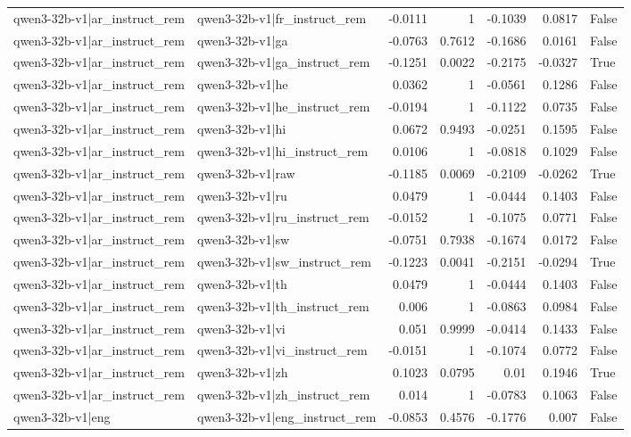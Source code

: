 \begin{table}
\begin{tabular}{l l r r r r l}
qwen3-32b-v1|ar_instruct_rem & qwen3-32b-v1|fr_instruct_rem & -0.0111 & 1 & -0.1039 & 0.0817 & False \\
qwen3-32b-v1|ar_instruct_rem & qwen3-32b-v1|ga & -0.0763 & 0.7612 & -0.1686 & 0.0161 & False \\
qwen3-32b-v1|ar_instruct_rem & qwen3-32b-v1|ga_instruct_rem & -0.1251 & 0.0022 & -0.2175 & -0.0327 & True \\
qwen3-32b-v1|ar_instruct_rem & qwen3-32b-v1|he & 0.0362 & 1 & -0.0561 & 0.1286 & False \\
qwen3-32b-v1|ar_instruct_rem & qwen3-32b-v1|he_instruct_rem & -0.0194 & 1 & -0.1122 & 0.0735 & False \\
qwen3-32b-v1|ar_instruct_rem & qwen3-32b-v1|hi & 0.0672 & 0.9493 & -0.0251 & 0.1595 & False \\
qwen3-32b-v1|ar_instruct_rem & qwen3-32b-v1|hi_instruct_rem & 0.0106 & 1 & -0.0818 & 0.1029 & False \\
qwen3-32b-v1|ar_instruct_rem & qwen3-32b-v1|raw & -0.1185 & 0.0069 & -0.2109 & -0.0262 & True \\
qwen3-32b-v1|ar_instruct_rem & qwen3-32b-v1|ru & 0.0479 & 1 & -0.0444 & 0.1403 & False \\
qwen3-32b-v1|ar_instruct_rem & qwen3-32b-v1|ru_instruct_rem & -0.0152 & 1 & -0.1075 & 0.0771 & False \\
qwen3-32b-v1|ar_instruct_rem & qwen3-32b-v1|sw & -0.0751 & 0.7938 & -0.1674 & 0.0172 & False \\
qwen3-32b-v1|ar_instruct_rem & qwen3-32b-v1|sw_instruct_rem & -0.1223 & 0.0041 & -0.2151 & -0.0294 & True \\
qwen3-32b-v1|ar_instruct_rem & qwen3-32b-v1|th & 0.0479 & 1 & -0.0444 & 0.1403 & False \\
qwen3-32b-v1|ar_instruct_rem & qwen3-32b-v1|th_instruct_rem & 0.006 & 1 & -0.0863 & 0.0984 & False \\
qwen3-32b-v1|ar_instruct_rem & qwen3-32b-v1|vi & 0.051 & 0.9999 & -0.0414 & 0.1433 & False \\
qwen3-32b-v1|ar_instruct_rem & qwen3-32b-v1|vi_instruct_rem & -0.0151 & 1 & -0.1074 & 0.0772 & False \\
qwen3-32b-v1|ar_instruct_rem & qwen3-32b-v1|zh & 0.1023 & 0.0795 & 0.01 & 0.1946 & True \\
qwen3-32b-v1|ar_instruct_rem & qwen3-32b-v1|zh_instruct_rem & 0.014 & 1 & -0.0783 & 0.1063 & False \\
qwen3-32b-v1|eng & qwen3-32b-v1|eng_instruct_rem & -0.0853 & 0.4576 & -0.1776 & 0.007 & False \\

\end{tabular}
\end{table}
